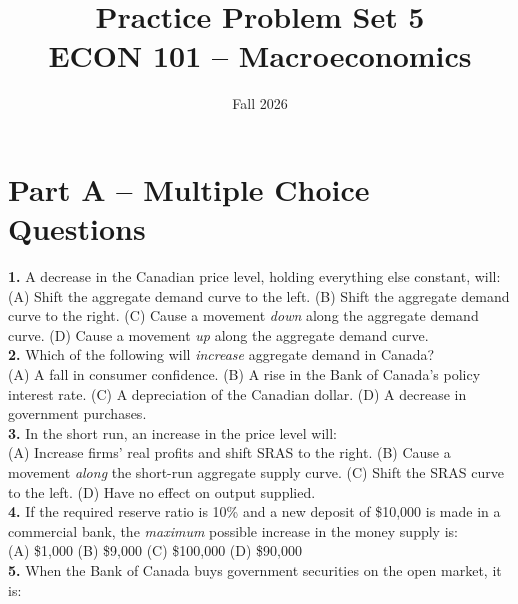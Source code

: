 \documentclass[12pt]{article}
\title{Practice Problem Set 5\\ \vspace{15pt} \large ECON 101 -- Macroeconomics}
\author{}
\date{Fall 2026}
\begin{document}
\maketitle



\section*{Part A – Multiple Choice Questions}

\textbf{1.}  
A decrease in the Canadian price level, holding everything else constant, will:  \\

(A) Shift the aggregate demand curve to the left.  
(B) Shift the aggregate demand curve to the right.  
(C) Cause a movement \emph{down} along the aggregate demand curve.  
(D) Cause a movement \emph{up} along the aggregate demand curve.\\



\textbf{2.}  
Which of the following will \emph{increase} aggregate demand in Canada?  \\

(A) A fall in consumer confidence.  
(B) A rise in the Bank of Canada’s policy interest rate.  
(C) A depreciation of the Canadian dollar.  
(D) A decrease in government purchases.\\



\textbf{3.}  
In the short run, an increase in the price level will:  \\

(A) Increase firms’ real profits and shift SRAS to the right.  
(B) Cause a movement \emph{along} the short-run aggregate supply curve.  
(C) Shift the SRAS curve to the left.  
(D) Have no effect on output supplied.\\



\textbf{4.}  
If the required reserve ratio is 10\% and a new deposit of \$10,000 is made in a commercial bank, the \emph{maximum} possible increase in the money supply is:  \\

(A) \$1,000 \quad (B) \$9,000 \quad (C) \$100,000 \quad (D) \$90,000\\



\textbf{5.}  
When the Bank of Canada buys government securities on the open market, it is:  \\
\end{document}
